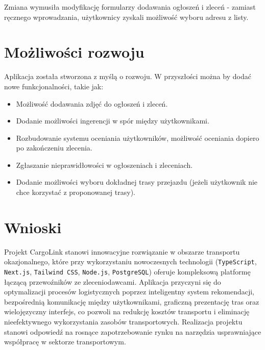 Zmiana wymusiła modyfikację formularzy dodawania ogłoszeń i zleceń - zamiast ręcznego wprowadzania, użytkownicy zyskali możliwość wyboru adresu z listy.

\section{Możliwości rozwoju}

Aplikacja została stworzona z myślą o rozwoju. W przyszłości można by dodać nowe funkcjonalności, takie jak:
\begin{itemize}
    \item Możliwość dodawania zdjęć do ogłoszeń i zleceń.
    \item Dodanie możliwości ingerencji w spór między użytkownikami.
    \item Rozbudowanie systemu oceniania użytkowników, możliwość oceniania dopiero po zakończeniu zlecenia.
    \item Zgłaszanie nieprawidłowości w ogłoszeniach i zleceniach.
    \item Dodanie możliwości wyboru dokładnej trasy przejazdu (jeżeli użytkownik nie chce korzystać z proponowanej trasy).
\end{itemize}

\section{Wnioski}

Projekt CargoLink stanowi innowacyjne rozwiązanie w obszarze transportu okazjonalnego, które przy wykorzystaniu nowoczesnych technologii (\texttt{TypeScript}, \texttt{Next.js}, \texttt{Tailwind CSS}, \texttt{Node.js}, \texttt{PostgreSQL}) oferuje kompleksową platformę łączącą przewoźników ze zleceniodawcami. Aplikacja przyczyni się do optymalizacji procesów logistycznych poprzez inteligentny system rekomendacji, bezpośrednią komunikację między użytkownikami, graficzną prezentację tras oraz wielojęzyczny interfejs, co pozwoli na redukcję kosztów transportu i eliminację nieefektywnego wykorzystania zasobów transportowych. Realizacja projektu stanowi odpowiedź na rosnące zapotrzebowanie rynku na narzędzia usprawniające współpracę w sektorze transportowym.
